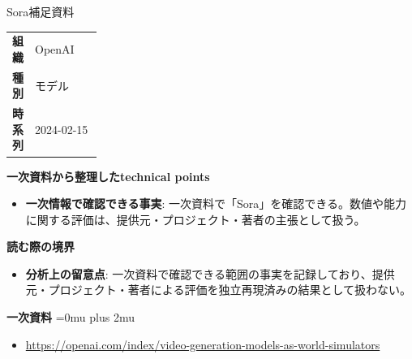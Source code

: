 \begin{technicalnote}{Sora}{補足資料}
\begingroup
\begin{tabularx}{\linewidth}{@{}>{\bfseries}p{0.22\linewidth}X@{}}
組織 & OpenAI \\
種別 & モデル \\
時系列 & 2024-02-15 \\
\end{tabularx}
\smallskip
{\bfseries 一次資料から整理したtechnical points}
\begin{itemize}[leftmargin=1.5em,itemsep=0.35em]
\item \textbf{一次情報で確認できる事実}: 一次資料で「Sora」を確認できる。数値や能力に関する評価は、提供元・プロジェクト・著者の主張として扱う。
\end{itemize}
\begin{minipage}{\linewidth}
{\bfseries 読む際の境界}
\begin{itemize}[leftmargin=1.5em,itemsep=0.35em]
\item \textbf{分析上の留意点}: 一次資料で確認できる範囲の事実を記録しており、提供元・プロジェクト・著者による評価を独立再現済みの結果として扱わない。
\end{itemize}
\begin{samepage}
{\bfseries 一次資料}
\begingroup\sloppy
\Urlmuskip=0mu plus 2mu\relax
\begin{itemize}[leftmargin=1.5em,itemsep=0.25em]
\item {\scriptsize\url{https://openai.com/index/video-generation-models-as-world-simulators}}
\end{itemize}
\endgroup
\end{samepage}
\end{minipage}
\endgroup
\end{technicalnote}
\medskip

